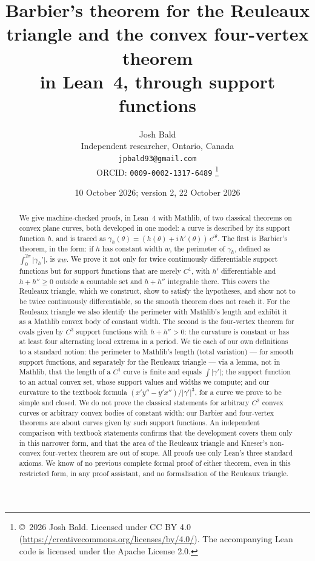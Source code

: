 \documentclass[11pt]{article}
\title{Barbier's theorem for the Reuleaux triangle and the convex four-vertex theorem\\
in Lean~4, through support functions}
\author{Josh Bald\\ \small Independent researcher, Ontario, Canada\\ \small\texttt{jpbald93@gmail.com}\\
\small ORCID: \texttt{0009-0002-1317-6489}
\thanks{\copyright~2026 Josh Bald. Licensed under CC BY 4.0 (\url{https://creativecommons.org/licenses/by/4.0/}). The accompanying Lean code is licensed under the Apache License 2.0.}}
\date{10 October 2026; version 2, 22 October 2026}
\theoremstyle{definition}
\theoremstyle{remark}
\begin{document}
\sloppy
\maketitle

\begin{abstract}
We give machine-checked proofs, in Lean~4 with Mathlib, of two classical theorems on convex plane
curves, both developed in one model: a curve is described by its support function $h$, and is
traced as $\gamma_h(\theta) = (h(\theta) + i\,h'(\theta))\,e^{i\theta}$.
The first is Barbier's theorem, in the form: if $h$ has constant width $w$, the perimeter of
$\gamma_h$, defined as $\int_0^{2\pi}\lvert\gamma_h'\rvert$, is $\pi w$. We prove it
not only for twice continuously differentiable support functions but for support functions that are
merely $C^1$, with $h'$ differentiable and $h+h''\ge 0$ outside a countable set and $h+h''$
integrable there. This covers the Reuleaux
triangle, which we construct, show to satisfy the hypotheses, and show not to be twice
continuously differentiable, so the smooth theorem does not reach it. For the Reuleaux triangle we also identify the perimeter
with Mathlib's length and exhibit it as a Mathlib convex body of constant width. The second is the four-vertex theorem for
ovals given by $C^3$ support functions with $h+h''>0$: the curvature is constant or has at least four
alternating local extrema in a period. We tie each of our own definitions to a standard notion: the perimeter to
Mathlib's length (total variation) --- for smooth support functions, and separately for the Reuleaux
triangle --- via a lemma, not in Mathlib, that the length of a $C^1$ curve
is finite and equals $\int\lvert\gamma'\rvert$; the support function to an actual convex set, whose
support values and widths we compute; and our curvature to the textbook formula
$(x'y''-y'x'')/\lvert\gamma'\rvert^3$, for a curve we prove to be simple and closed.
We do not prove the classical statements for arbitrary $C^2$ convex curves or arbitrary convex
bodies of constant width: our Barbier and four-vertex theorems are about curves given by such support functions. An
independent comparison with textbook statements confirms that the development covers them only in
this narrower form, and that the area of the Reuleaux triangle and Kneser's non-convex four-vertex
theorem are out of scope.
All proofs use only Lean's three standard axioms. We know of no previous complete formal proof of
either theorem, even in this restricted form, in any proof assistant, and no formalisation of the Reuleaux triangle.
\end{abstract}
\end{document}
